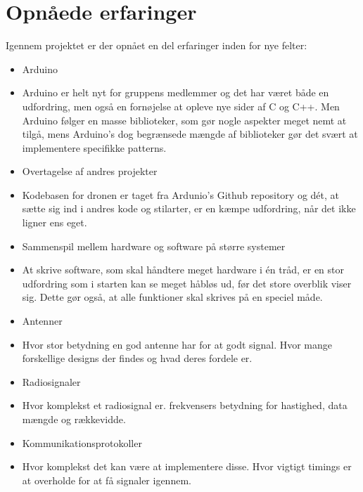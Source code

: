 \documentclass[Main]{subfiles}
\begin{document}
\section{Opnåede erfaringer}

Igennem projektet er der opnået en del erfaringer inden for nye felter:

\begin{itemize}
\item Arduino
\item[] Arduino er helt nyt for gruppens medlemmer og det har været både en udfordring, men også en fornøjelse at opleve nye sider af C og C++.
Men Arduino følger en masse biblioteker, som gør nogle aspekter meget nemt at tilgå, mens Arduino's dog begrænsede mængde af biblioteker gør det svært at implementere specifikke patterns.

\item Overtagelse af andres projekter
\item[] Kodebasen for dronen er taget fra Ardunio's Github repository og dét, at sætte sig ind i andres kode og stilarter, er en kæmpe udfordring, når det ikke ligner ens eget.


\item Sammenspil mellem hardware og software på større systemer
\item[] At skrive software, som skal håndtere meget hardware i én tråd, er en stor udfordring som i starten kan se meget håbløs ud, før det store overblik viser sig.
Dette gør også, at alle funktioner skal skrives på en speciel måde.

\item Antenner
\item[] Hvor stor betydning en god antenne har for at godt signal. Hvor mange forskellige designs der findes og hvad deres fordele er.

\item Radiosignaler
\item[] Hvor komplekst et radiosignal er. frekvensers betydning for hastighed, data mængde og rækkevidde.

\item Kommunikationsprotokoller
\item[] Hvor komplekst det kan være at implementere disse. Hvor vigtigt timings er at overholde for at få signaler igennem. 

\end{itemize}
\end{document}
